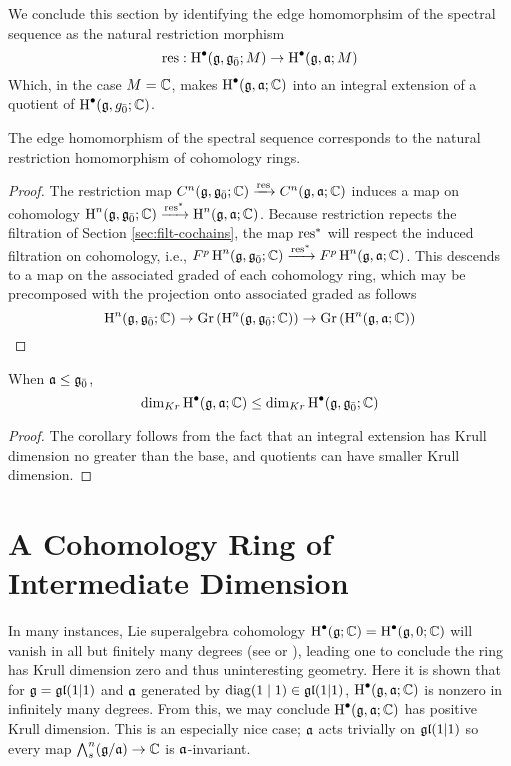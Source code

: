 We conclude this section by identifying the edge homomorphsim of the spectral sequence as the natural restriction morphism
\begin{equation}
  \label{eq:restriction}
  \operatorname{res}: \operatorname{H}^\bullet(\mathfrak{g},{\mathfrak{g}}_{\bar{0}};M) \to \operatorname{H}^\bullet(\mathfrak{g},\mathfrak{a};M)
\end{equation}
Which, in the case $M = \mathbb{C}$, makes $\operatorname{H}^\bullet(\mathfrak{g},\mathfrak{a};\mathbb{C})$ into an integral extension of a quotient of $\operatorname{H}^\bullet(\mathfrak{g},{g}_{\bar{0}};\mathbb{C})$.

\begin{proposition}
  The edge homomorphism of the spectral sequence corresponds to the natural restriction homomorphism of cohomology rings.
\end{proposition}
\begin{proof}
The restriction map $C^n(\mathfrak{g},{\mathfrak{g}}_{\bar{0}};\mathbb{C}) \xrightarrow{\operatorname{res}} C^n(\mathfrak{g},\mathfrak{a};\mathbb{C})$ induces a map on cohomology $\operatorname{H}^n(\mathfrak{g},{\mathfrak{g}}_{\bar{0}};\mathbb{C}) \xrightarrow{\operatorname{res}^*} \operatorname{H}^n(\mathfrak{g},\mathfrak{a};\mathbb{C})$. Because restriction repects the filtration of Section \ref{sec:filt-cochains}, the map $\operatorname{res}^*$ will respect the induced filtration on cohomology, i.e., $F^p \operatorname{H}^n(\mathfrak{g},{\mathfrak{g}}_{\bar{0}};\mathbb{C}) \xrightarrow{\operatorname{res}^*} F^p\operatorname{H}^n(\mathfrak{g},\mathfrak{a};\mathbb{C})$. This descends to a map on the associated graded of each cohomology ring, which may be precomposed with the projection onto associated graded as follows
  \[
    \operatorname{H}^n(\mathfrak{g},{\mathfrak{g}}_{\bar{0}};\mathbb{C}) \to \operatorname{Gr}\left(\operatorname{H}^n(\mathfrak{g},{\mathfrak{g}}_{\bar{0}};\mathbb{C}) \right) \to \operatorname{Gr}\left( \operatorname{H}^n(\mathfrak{g},\mathfrak{a};\mathbb{C}) \right)
  \]

\end{proof}

\begin{corollary}
  When $\mathfrak{a} \leq {\mathfrak{g}}_{\bar{0}}$,
  \[
    \dim_{Kr}\operatorname{H}^\bullet(\mathfrak{g},\mathfrak{a};\mathbb{C}) \leq \dim_{Kr}\operatorname{H}^\bullet(\mathfrak{g},{\mathfrak{g}}_{\bar{0}};\mathbb{C})
  \]
  
\end{corollary}
\begin{proof}
  The corollary follows from the fact that an integral extension has Krull dimension no greater than the base, and quotients can have smaller Krull dimension.
\end{proof}



\section{A Cohomology Ring of Intermediate Dimension}
\label{sec:int-dim}

  In many instances, Lie superalgebra cohomology $\operatorname{H}^\bullet(\mathfrak{g};\mathbb{C}) = \operatorname{H}^\bullet(\mathfrak{g},0;\mathbb{C})$ will vanish in all but finitely many degrees (see \cite{fuks-leites} or \cite[Th\'eor\`eme 5.3]{MR1450424}), leading one to conclude the ring has Krull dimension zero and thus uninteresting geometry. Here it is shown that for $\mathfrak{g} = \mathfrak{gl}(1|1)$ and $\mathfrak{a}$ generated by $\operatorname{diag}(1 \mid 1) \in \mathfrak{gl}(1|1)$, $\operatorname{H}^\bullet(\mathfrak{g},\mathfrak{a};\mathbb{C})$ is nonzero in infinitely many degrees. From this, we may conclude $\operatorname{H}^\bullet(\mathfrak{g},\mathfrak{a};\mathbb{C})$ has positive Krull dimension. This is an especially nice case; $\mathfrak{a}$ acts trivially on $\mathfrak{gl}(1|1)$ so every map $\bigwedge\nolimits^{n}_s(\mathfrak{g}/\mathfrak{a}) \to \mathbb{C}$ is $\mathfrak{a}$-invariant.

